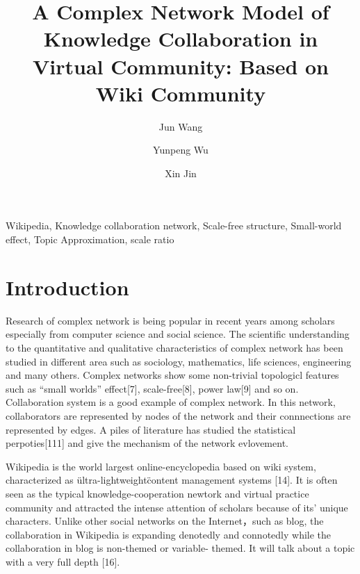 \documentclass{elsarticle}
\begin{document}
\begin{frontmatter}
\title{A Complex Network Model of Knowledge Collaboration in Virtual Community: Based on Wiki Community
}
\author[buaa]{Jun Wang}

\author[buaa]{Yunpeng Wu}

\author[buaa]{Xin Jin}

\address[buaa]{School of Economics and Management, Beihang University, 
Beijing 100083, P.R. China}

\begin{abstract}
  
\end{abstract}

\begin{keyword}
Wikipedia, Knowledge collaboration network, Scale-free structure,
Small-world effect, Topic Approximation, scale ratio
  
\end{keyword}
\end{frontmatter}

\section{Introduction}
\label{sec:introduction}

Research of complex network is being popular in recent years among scholars
especially from computer science and social science.
 The scientific understanding to the quantitative and
qualitative characteristics of complex network has been studied in
different area such as sociology, mathematics, life sciences,
engineering and many others. Complex networks show some non-trivial
topologicl features such as “small worlds” effect[7], scale-free[8],
power law[9] and so on. Collaboration system is a good example of
complex network. In this network, collaborators are represented by nodes of the network
and their connnections are represented by edges. A piles of literature
has studied the statistical perpoties[111] and give the mechanism of
the network evlovement.



Wikipedia is the world largest online-encyclopedia based on wiki
system,  characterized as \"ultra-lightweight\" content management systems
[14]. It is often seen as the typical knowledge-cooperation newtork and virtual
practice community and attracted the intense attention of scholars
because of its' unique characters. Unlike other social networks on the
Internet，such as blog,  the
collaboration in Wikipedia is expanding denotedly and connotedly while the collaboration in blog is non-themed or variable- themed. It will talk about a topic with a very full depth [16].
\end{document}

